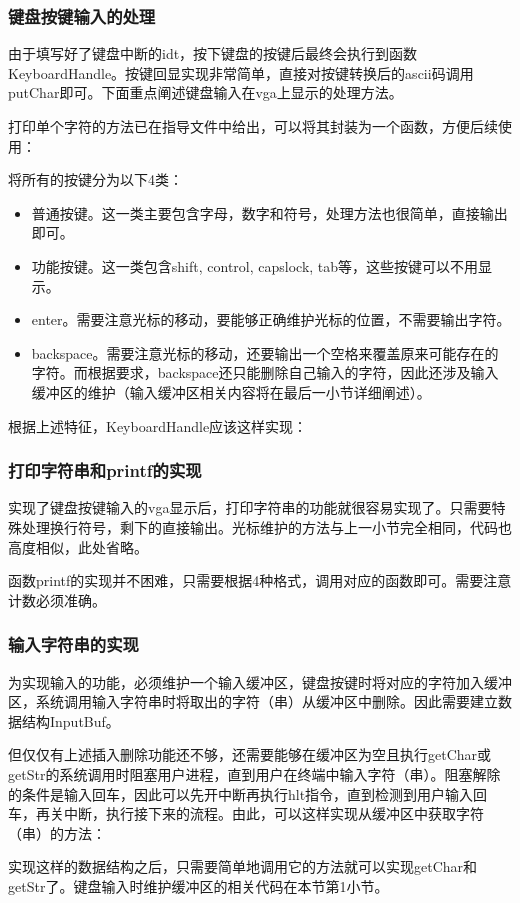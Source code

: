 \documentclass[12pt,a4paper,UTF8]{article}
\begin{document}
\subsubsection{键盘按键输入的处理}
由于填写好了键盘中断的idt，按下键盘的按键后最终会执行到函数KeyboardHandle。按键回显实现非常简单，直接对按键转换后的ascii码调用putChar即可。下面重点阐述键盘输入在vga上显示的处理方法。
\par 打印单个字符的方法已在指导文件中给出，可以将其封装为一个函数，方便后续使用：


\par 将所有的按键分为以下4类：
\begin{itemize}
	\item 普通按键。这一类主要包含字母，数字和符号，处理方法也很简单，直接输出即可。
	\item 功能按键。这一类包含shift, control, capslock, tab等，这些按键可以不用显示。
	\item enter。需要注意光标的移动，要能够正确维护光标的位置，不需要输出字符。
	\item backspace。需要注意光标的移动，还要输出一个空格来覆盖原来可能存在的字符。而根据要求，backspace还只能删除自己输入的字符，因此还涉及输入缓冲区的维护（输入缓冲区相关内容将在最后一小节详细阐述）。
\end{itemize}
\par 根据上述特征，KeyboardHandle应该这样实现：


\subsubsection{打印字符串和printf的实现}
实现了键盘按键输入的vga显示后，打印字符串的功能就很容易实现了。只需要特殊处理换行符号，剩下的直接输出。光标维护的方法与上一小节完全相同，代码也高度相似，此处省略。
\par 函数printf的实现并不困难，只需要根据4种格式，调用对应的函数即可。需要注意计数必须准确。


\subsubsection{输入字符串的实现}
为实现输入的功能，必须维护一个输入缓冲区，键盘按键时将对应的字符加入缓冲区，系统调用输入字符串时将取出的字符（串）从缓冲区中删除。因此需要建立数据结构InputBuf。

\par 但仅仅有上述插入删除功能还不够，还需要能够在缓冲区为空且执行getChar或getStr的系统调用时阻塞用户进程，直到用户在终端中输入字符（串）。阻塞解除的条件是输入回车，因此可以先开中断再执行hlt指令，直到检测到用户输入回车，再关中断，执行接下来的流程。由此，可以这样实现从缓冲区中获取字符（串）的方法：

\par 实现这样的数据结构之后，只需要简单地调用它的方法就可以实现getChar和getStr了。键盘输入时维护缓冲区的相关代码在本节第1小节。
\end{document}
